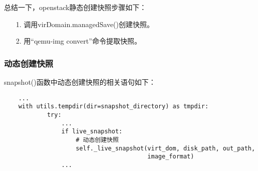 \documentclass[a4paper,left=1.5cm,right=1.5cm,11pt]{article}
\begin{document}
	总结一下，openstack静态创建快照步骤如下：
	\begin{itemize}
		\item[1.] 调用virDomain.managedSave()创建快照。
		\item[2.] 用“qemu-img convert”命令提取快照。
	\end{itemize}

\subsubsection{动态创建快照}
	snapshot()函数中动态创建快照的相关语句如下：
	\begin{lstlisting}
	...
	with utils.tempdir(dir=snapshot_directory) as tmpdir:
            try:
				...
                if live_snapshot:
					# 动态创建快照
                    self._live_snapshot(virt_dom, disk_path, out_path,
                                        image_format)
				...
	\end{lstlisting}
\end{document}
